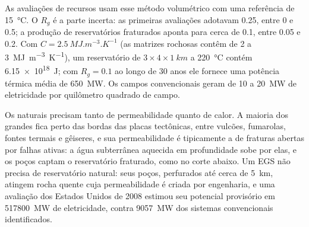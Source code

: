 As avaliações de recursos usam esse método volumétrico com uma referência de \qty{15}{\celsius}. O  $R_g$ é a parte incerta: as primeiras avaliações adotavam 0.25, entre 0 e 0.5; a produção de
reservatórios fraturados aponta para cerca de 0.1, entre 0.05 e 0.2. Com $C = \qty{2.5}{MJ.m^{-3}.K^{-1}}$
(as matrizes rochosas contêm de 2 a \qty{3}{MJ.m^{-3}.K^{-1}}), um reservatório de $3 \times 4 \times
\qty{1}{km}$ a \qty{220}{\celsius} contém \qty{6.15e18}{J}; com $R_g = 0.1$ ao longo de 30 anos ele
fornece uma potência térmica média de \qty{650}{MW}. Os campos convencionais geram de 10 a
\qty{20}{MW} de eletricidade por quilômetro quadrado de campo.

Os  naturais precisam tanto de permeabilidade quanto de calor. A maioria dos grandes fica perto das
bordas das placas tectônicas, entre vulcões, fumarolas, fontes termais e gêiseres, e sua
permeabilidade é tipicamente a de fraturas abertas por falhas ativas: a água subterrânea aquecida em profundidade
sobe por elas, e os poços captam o reservatório fraturado, como no corte abaixo. Um EGS não precisa de reservatório natural:
seus poços, perfurados até cerca de \qty{5}{km}, atingem rocha quente cuja permeabilidade é criada por engenharia, e
uma avaliação dos Estados Unidos de 2008 estimou seu potencial provisório em \qty{517800}{MW} de
eletricidade, contra \qty{9057}{MW} dos sistemas convencionais identificados.

